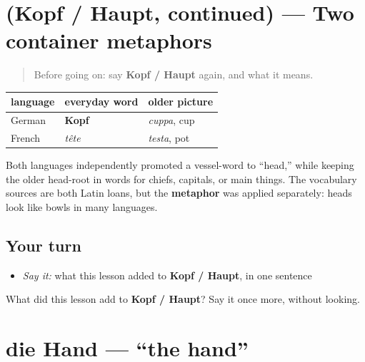 \section[(Kopf / Haupt, continued)]{(Kopf / Haupt, continued) — Two container metaphors}

\label{lesson:GE-C17-kopf-haupt-more}



\begin{quote}
Before going on: say \textbf{Kopf / Haupt} again, and what it means.
\end{quote}

\begin{culture}
\noindent
\begin{tabularx}{\linewidth}{@{}>{\raggedright\arraybackslash}X>{\raggedright\arraybackslash}X>{\raggedright\arraybackslash}X@{}}
\toprule
\textbf{language} & \textbf{everyday word} & \textbf{older picture} \\
\midrule
German & \textbf{Kopf} & \emph{cuppa}, cup \\
French & \emph{tête} & \emph{testa}, pot \\
\bottomrule
\end{tabularx}

Both languages independently promoted a vessel-word to “head,” while keeping the older head-root in words for chiefs, capitals, or main things. The vocabulary sources are both Latin loans, but the \textbf{metaphor} was applied separately: heads look like bowls in many languages.
\end{culture}

\subsection*{Your turn}
\begin{itemize}
\raggedright
  \item \emph{Say it:} what this lesson added to \textbf{Kopf / Haupt}, in one sentence
\end{itemize}

\begin{tcolorbox}[breakable,colback=teal!4,colframe=teal!35!black,title={Before you move on}]
What did this lesson add to \textbf{Kopf / Haupt}? Say it once more, without looking.
\end{tcolorbox}
\section[die Hand]{die Hand — \textquotedblleft{}the hand\textquotedblright{}}

